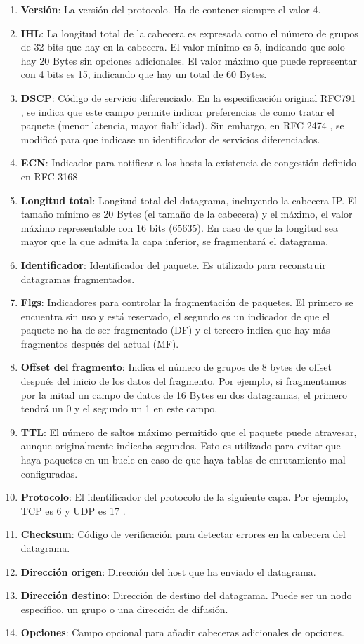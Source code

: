 \begin{enumerate}
    \item \textbf{Versión}: La versión del protocolo. Ha de contener siempre el valor 4.
    \item \textbf{IHL}: La longitud total de la cabecera es expresada como el número de grupos de 32 bits que hay en la cabecera. El valor mínimo es 5, indicando que solo hay 20 Bytes sin opciones adicionales. El valor máximo que puede representar con 4 bits es 15, indicando que hay un total de 60 Bytes.
    \item \textbf{DSCP}: Código de servicio diferenciado. En la especificación original RFC791 \cite{rfc791}, se indica que este campo permite indicar preferencias de como tratar el paquete (menor latencia, mayor fiabilidad). Sin embargo, en RFC 2474 \cite{rfc2474}, se modificó para que indicase un identificador de servicios diferenciados.
    \item \textbf{ECN}: Indicador para notificar a los hosts la existencia de congestión definido en RFC 3168 \cite{rfc3168}
    \item \textbf{Longitud total}: Longitud total del datagrama, incluyendo la cabecera IP. El tamaño mínimo es 20 Bytes (el tamaño de la cabecera) y el máximo, el valor máximo representable con 16 bits (65635). En caso de que la longitud sea mayor que la que admita la capa inferior, se fragmentará el datagrama.
    \item \textbf{Identificador}: Identificador del paquete. Es utilizado para reconstruir datagramas fragmentados.
    \item \textbf{Flgs}: Indicadores para controlar la fragmentación de paquetes. El primero se encuentra sin uso y está reservado, el segundo es un indicador de que el paquete no ha de ser fragmentado (DF) y el tercero indica que hay más fragmentos después del actual (MF).
    \item \textbf{Offset del fragmento}: Indica el número de grupos de 8 bytes de offset después del inicio de los datos del fragmento. Por ejemplo, si fragmentamos por la mitad un campo de datos de 16 Bytes en dos datagramas, el primero tendrá un 0 y el segundo un 1 en este campo.
    \item \textbf{TTL}: El número de saltos máximo permitido que el paquete puede atravesar, aunque originalmente indicaba segundos. Esto es utilizado para evitar que haya paquetes en un bucle en caso de que haya tablas de enrutamiento mal configuradas.
    \item \textbf{Protocolo}: El identificador del protocolo de la siguiente capa. Por ejemplo, TCP es 6 y UDP es 17 \cite{ipprotocolnumbers}.
    \item \textbf{Checksum}: Código de verificación para detectar errores en la cabecera del datagrama.
    \item \textbf{Dirección origen}: Dirección del host que ha enviado el datagrama.
    \item \textbf{Dirección destino}: Dirección de destino del datagrama. Puede ser un nodo específico, un grupo o una dirección de difusión.
    \item \textbf{Opciones}: Campo opcional para añadir cabeceras adicionales de opciones.
\end{enumerate}

